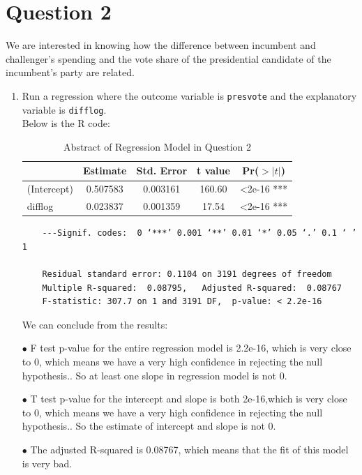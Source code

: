 \documentclass[12pt,letterpaper]{article}
\begin{document}
\section*{Question 2}
\noindent We are interested in knowing how the difference between incumbent and challenger's spending and the vote share of the presidential candidate of the incumbent's party are related.	\vspace{.25cm}
	\begin{enumerate}
			\item Run a regression where the outcome variable is \texttt{presvote} and the explanatory variable is \texttt{difflog}. \\
			
	Below is the R code:
	

	\begin{table}[ht]
		\centering
		\caption{Abstract of Regression Model in Question 2}
		\begin{tabular}{lcccc}
			\toprule
			& Estimate & Std. Error & t value & Pr($>|t|$) \\
			\midrule
			(Intercept) & 0.507583 &0.003161 & 160.60 & <2e-16 *** \\
			difflog & 0.023837 & 0.001359 & 17.54 & <2e-16 *** \\
			\bottomrule
		\end{tabular} 
	\end{table}
	\begin{verbatim}
	---Signif. codes:  0 ‘***’ 0.001 ‘**’ 0.01 ‘*’ 0.05 ‘.’ 0.1 ‘ ’ 1
	
	Residual standard error: 0.1104 on 3191 degrees of freedom
	Multiple R-squared:  0.08795,	Adjusted R-squared:  0.08767 
	F-statistic: 307.7 on 1 and 3191 DF,  p-value: < 2.2e-16
	\end{verbatim}
		We can conclude from the results:
		\item[$\bullet$] F test p-value for the entire regression model is 2.2e-16, which is very close to 0, which means we have a very high confidence in rejecting the null hypothesis.. So at least one slope in regression model is not 0.
		\item[$\bullet$] T test p-value for the intercept and slope is both 2e-16,which is very close to 0, which means we have a very high confidence in rejecting the null hypothesis.. So the estimate of intercept and slope is not 0.
		\item[$\bullet$] The adjusted R-squared is 0.08767, which means that the fit of this model is very bad.
		

\end{enumerate}
\end{document}
